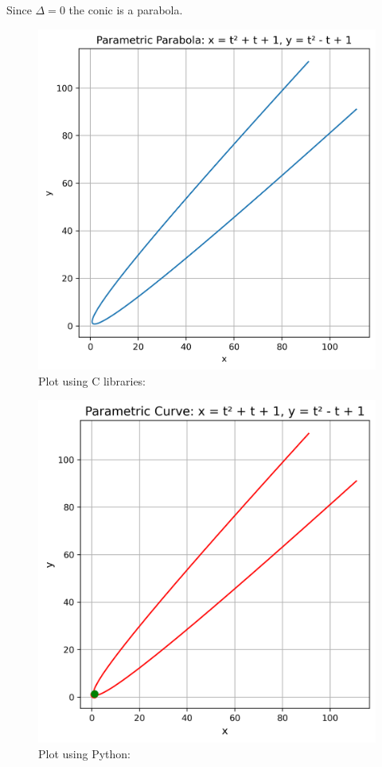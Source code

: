 \documentclass{beamer}
\numberwithin{equation}{section}
\begin{document}
Since $\Delta=0$ the conic is a parabola.

\begin{figure}[H]
	\centering
	\includegraphics[scale=0.5]{img1}
	\caption*{Plot using C libraries:}
	\label{img1}
\end{figure}
\begin{figure}[H]
	\centering
	\includegraphics[scale=0.5]{img2}
	\caption*{
		Plot using Python:}
	\label{img2}
\end{figure}
\end{document}
